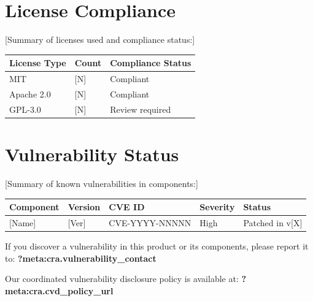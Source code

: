\documentclass[
  11 pt,
  a4paper,
  table]{report}
\begin{document}
\section{License Compliance}\label{license-compliance}

{[}Summary of licenses used and compliance status:{]}

\begin{longtable}[]{@{}lll@{}}
\toprule\noalign{}
License Type & Count & Compliance Status \\
\midrule\noalign{}
\endhead
\bottomrule\noalign{}
\endlastfoot
MIT & {[}N{]} & Compliant \\
Apache 2.0 & {[}N{]} & Compliant \\
GPL-3.0 & {[}N{]} & Review required \\
\end{longtable}

\section{Vulnerability Status}\label{vulnerability-status}

{[}Summary of known vulnerabilities in components:{]}

\begin{longtable}[]{@{}lllll@{}}
\toprule\noalign{}
Component & Version & CVE ID & Severity & Status \\
\midrule\noalign{}
\endhead
\bottomrule\noalign{}
\endlastfoot
{[}Name{]} & {[}Ver{]} & CVE-YYYY-NNNNN & High & Patched in v{[}X{]} \\
\end{longtable}

\begin{tcolorbox}[enhanced jigsaw, coltitle=black, bottomrule=.15mm, colback=white, leftrule=.75mm, opacitybacktitle=0.6, rightrule=.15mm, opacityback=0, arc=.35mm, toprule=.15mm, colframe=quarto-callout-warning-color-frame, breakable, left=2mm, colbacktitle=quarto-callout-warning-color!10!white, titlerule=0mm, bottomtitle=1mm, toptitle=1mm, title=\textcolor{quarto-callout-warning-color}{\faExclamationTriangle}\hspace{0.5em}{Vulnerability Disclosure}]

If you discover a vulnerability in this product or its components,
please report it to: \textbf{?meta:cra.vulnerability\_contact}

Our coordinated vulnerability disclosure policy is available at:
\textbf{?meta:cra.cvd\_policy\_url}

\end{tcolorbox}
\end{document}
